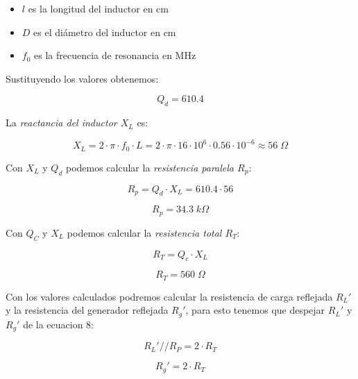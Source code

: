 \begin{itemize}
    \item $l$ es la longitud del inductor en cm
    \item $D$ es el diámetro del inductor en cm
    \item $f_0$ es la frecuencia de resonancia en MHz
\end{itemize}

Sustituyendo los valores obtenemos:

\begin{equation}
    \boxed{Q_d = 610.4}
\end{equation}

La \textit{reactancia del inductor $X_L$} es:

\begin{equation}
    X_L = 2 \cdot \pi \cdot f_0 \cdot L = 2 \cdot \pi \cdot 16 \cdot 10^6 \cdot 0.56 \cdot 10^{-6} \approx 56\; \Omega
\end{equation}

Con $X_L$ y $Q_d$ podemos calcular la \textit{resistencia paralela $R_p$}:

\begin{equation}
    R_p = Q_d \cdot X_L = 610.4 \cdot 56 
\end{equation}

\begin{equation}
    \boxed{R_p = 34.3\; k\Omega}
\end{equation}

Con $Q_C$ y $X_L$ podemos calcular la \textit{resistencia total $R_T$}:

\begin{equation}
    R_T = Q_c \cdot X_L
\end{equation}

\begin{equation}
    \boxed{R_T = 560\; \Omega}
\end{equation}

Con los valores calculados podremos calcular la resistencia de carga reflejada $R_L'$ y la resistencia del generador reflejada $R_g'$, para esto tenemos que despejar $R_L'$ y $R_g'$ de la ecuacion 8:

\begin{equation}
    R_L' // R_P = 2 \cdot R_T 
\end{equation}

\begin{equation}
    R_g' = 2 \cdot R_T 
\end{equation}

